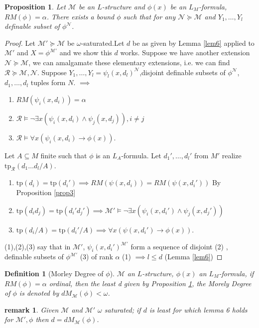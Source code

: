 \documentclass[letterpaper, 12pt]{article}
\newcommand{\fin}{\qquad \quad \hfill \framebox[1.75mm][l]{\,}}
\newcommand{\cR}{\mathcal{R}}
\newcommand{\cM}{\mathcal{M}}
\newcommand{\cN}{\mathcal{N}}
\newcommand{\tp}{\mbox{tp}}
\theoremstyle{stdthm}
\newtheorem{prop}[thm]{Proposition}
\theoremstyle{stddef}
\newtheorem{defn}[thm]{Definition}
\newtheorem{rem}[thm]{remark} %
\theoremstyle{stdnonum}
\theoremstyle{stdqands}
\theoremstyle{stdbold}
\begin{document}
\begin{prop}\label{prop7}
Let $\cM$ be an $L$-structure and $\phi(x)$ be an $L_M$-formula, $RM(\phi) = \alpha$. There exists a bound $\phi$ such that for any $\cN \succeq \cM$ and $Y_1,\dots, Y_l$ definable subset of $\phi^\cN$. 
\end{prop}

\begin{proof}
Let $\cM'\succeq \cM$ be  $\omega$-saturated.Let $d$ be as given by Lemma \ref{lem6} applied to $\cM'$ and $X = \phi^{\cM'}$ and we show this $d$ works.  Suppose we have another extension $\cN \succeq \cM$, we can amalgamate these elementary extensions, i.e. we can find $\cR \succeq \cM,\cN$. Suppose $Y_1,\dots, Y_l = \psi_l(x,d_l)^\cN$,disjoint definable subsets of $\phi^\cN$, $d_1,\dots,d_l$ tuples form $N$. $\implies$ 
\begin{enumerate}
\item $RM(\psi_i(x,d_i)) = \alpha$
\item $\cR \models \neg \exists x(\psi_i(x,d_i) \wedge \psi_j(x,d_j)), i\neq j$ 
\item $\cR \models \forall x(\psi_i(x,d_i) \to \phi(x))$. 
\end{enumerate}
Let $A\subseteq M$ finite such that $\phi$ is an $L_A$-formula. Let $d_1',\dots, d_l'$ from $M'$ realize $\tp_\cR(d_1\dots d_l/A)$. 
\begin{enumerate}
\item $\tp(d_i) = \tp(d_i') \implies RM(\psi(x,d_i)) = RM(\psi(x,d_i'))$ By Proposition \ref{prop3}
\item $\tp(d_id_j) = \tp(d_i'd_j') \implies \cM' \models \neg \exists x(\psi_i(x,d_i')\wedge \psi_j(x,d_j'))$
\item $\tp(d_i/A) = \tp(d_i'/A) \implies \forall x(\psi(x,d_i') \to \phi(x))$. 
\end{enumerate}
(1),(2),(3) say that in $\cM'$, $\psi_i(x,d_i')^{\cM'}$ form a sequence of disjoint (2) , definable subsets of $\phi^{\cM'}$ (3) of rank $\alpha$ (1) $\implies l \leq d $ (Lemma \ref{lem6}) 
\end{proof}

\begin{defn} [Morley Degree of $\phi$]
$\cM$ an $L$-structure, $\phi(x)$ an $L_M$-formula, if $RM(\phi) = \alpha$ ordinal, then the least d given by Proposition \ref{prop7}, the Morely Degree of $\phi$ is denoted by $dM_\cM(\phi)< \omega$. 
\end{defn}


\begin{rem}
Given $\cM$ and $\cM'$  $\omega$ saturated; if $d$ is least for which lemma 6 holds for $\cM',\phi$ then $d = dM_\cM(\phi)$.  
\end{rem}
\end{document}
